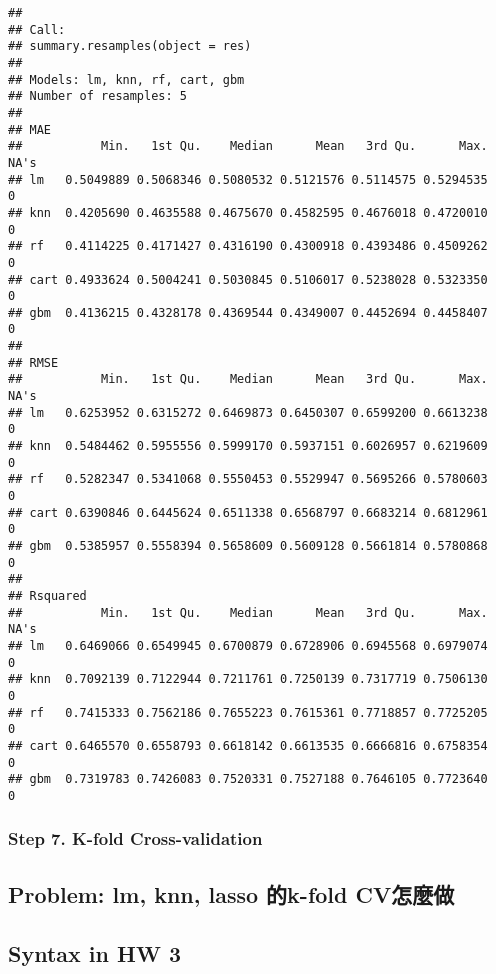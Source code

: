\documentclass[
]{article}
\begin{document}
\begin{verbatim}
## 
## Call:
## summary.resamples(object = res)
## 
## Models: lm, knn, rf, cart, gbm 
## Number of resamples: 5 
## 
## MAE 
##           Min.   1st Qu.    Median      Mean   3rd Qu.      Max. NA's
## lm   0.5049889 0.5068346 0.5080532 0.5121576 0.5114575 0.5294535    0
## knn  0.4205690 0.4635588 0.4675670 0.4582595 0.4676018 0.4720010    0
## rf   0.4114225 0.4171427 0.4316190 0.4300918 0.4393486 0.4509262    0
## cart 0.4933624 0.5004241 0.5030845 0.5106017 0.5238028 0.5323350    0
## gbm  0.4136215 0.4328178 0.4369544 0.4349007 0.4452694 0.4458407    0
## 
## RMSE 
##           Min.   1st Qu.    Median      Mean   3rd Qu.      Max. NA's
## lm   0.6253952 0.6315272 0.6469873 0.6450307 0.6599200 0.6613238    0
## knn  0.5484462 0.5955556 0.5999170 0.5937151 0.6026957 0.6219609    0
## rf   0.5282347 0.5341068 0.5550453 0.5529947 0.5695266 0.5780603    0
## cart 0.6390846 0.6445624 0.6511338 0.6568797 0.6683214 0.6812961    0
## gbm  0.5385957 0.5558394 0.5658609 0.5609128 0.5661814 0.5780868    0
## 
## Rsquared 
##           Min.   1st Qu.    Median      Mean   3rd Qu.      Max. NA's
## lm   0.6469066 0.6549945 0.6700879 0.6728906 0.6945568 0.6979074    0
## knn  0.7092139 0.7122944 0.7211761 0.7250139 0.7317719 0.7506130    0
## rf   0.7415333 0.7562186 0.7655223 0.7615361 0.7718857 0.7725205    0
## cart 0.6465570 0.6558793 0.6618142 0.6613535 0.6666816 0.6758354    0
## gbm  0.7319783 0.7426083 0.7520331 0.7527188 0.7646105 0.7723640    0
\end{verbatim}

\hypertarget{step-7.-k-fold-cross-validation}{%
\subsubsection{Step 7. K-fold
Cross-validation}\label{step-7.-k-fold-cross-validation}}

\hypertarget{problem-lm-knn-lasso-ux7684k-fold-cvux600eux9ebcux505a}{%
\subsection{Problem: lm, knn, lasso 的k-fold
CV怎麼做}\label{problem-lm-knn-lasso-ux7684k-fold-cvux600eux9ebcux505a}}

\hypertarget{syntax-in-hw-3}{%
\subsection{Syntax in HW 3}\label{syntax-in-hw-3}}
\end{document}
